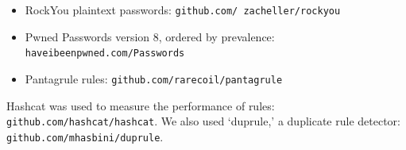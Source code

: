 \documentclass[letterpaper,twocolumn,10pt]{article}
\begin{document}
\begin{itemize}
\item RockYou plaintext passwords:
\texttt{github.com/ zacheller/rockyou}
\item Pwned Passwords version 8, ordered by prevalence:
\texttt{haveibeenpwned.com/Passwords}
\item Pantagrule rules: \texttt{github.com/rarecoil/pantagrule}
\end{itemize}

Hashcat was used to measure the performance of rules:
\texttt{github.com/hashcat/hashcat}.
We also used
`duprule,' a duplicate rule detector:
\texttt{github.com/mhasbini/duprule}.





\end{document}
